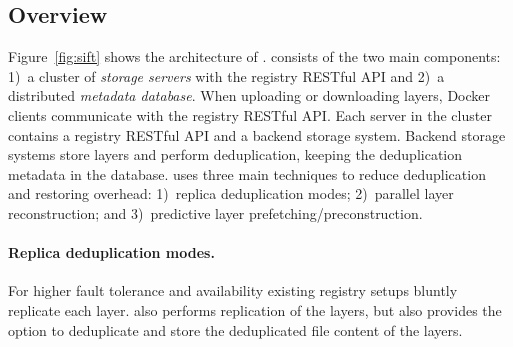 \subsection{Overview}
\label{sec:overview}



Figure~\ref{fig:sift} shows the architecture of \sysname.
%
\sysname consists of the two main components: %
1)~a cluster of \emph{storage servers}
with the registry RESTful API and 2)~a distributed
\emph{metadata database}. 
%
When uploading or downloading layers, 
Docker clients communicate with the
registry RESTful API.
%
%
Each server in the cluster contains a registry RESTful API and a backend storage system.
%
Backend storage systems store
layers and perform deduplication, keeping the deduplication metadata in the
database.
%
%
%
\sysname uses three main techniques to reduce deduplication and restoring overhead:
1)~replica deduplication modes; 2)~parallel layer reconstruction; and
3)~predictive layer prefetching/preconstruction.




\paragraph{Replica deduplication modes.}
%
For higher fault tolerance and availability existing registry setups bluntly
replicate  each layer.
%
\sysname also performs replication of the layers, but also provides the option to deduplicate and store the deduplicated file content of the layers.

